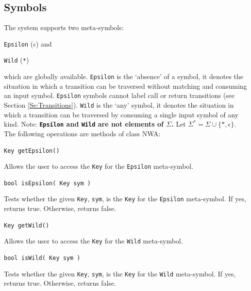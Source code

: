 \documentclass{llncs}
\begin{document}
\subsection{Symbols}
\label{Se:Symbols}

The system supports two meta-symbols: \begin{inparaenum} \item \texttt{Epsilon} (\texttt{$\epsilon$}) and \item \texttt{Wild} (\texttt{*}) \end{inparaenum} which are globally available.  \texttt{Epsilon} is the `absence' of a symbol, it denotes the situation in which a transition can be traversed without matching and consuming an input symbol.  \texttt{Epsilon} symbols cannot label call or return transitions (see Section \ref{Se:Transitions}).  \texttt{Wild} is the `any' symbol, it denotes the situation in which a transition can be traversed by consuming a single input symbol of any kind.  Note: \textbf{\texttt{Epsilon} and \texttt{Wild} are not elements of $\Sigma$.} Let $\Sigma^* = \Sigma \cup \{*, \epsilon\}$.\\  

\noindent The following operations are methods of class NWA:

\begin{description}

  \item\texttt{Key getEpsilon()}

    Allows the user to access the \texttt{Key} for the \texttt{Epsilon} meta-symbol.

  \item\texttt{bool isEpsilon( Key sym )}

    Tests whether the given \texttt{Key}, \texttt{sym}, is the \texttt{Key} for the \texttt{Epsilon} meta-symbol.  If yes, returns true.  Otherwise, returns false.

  \item\texttt{Key getWild()}

    Allows the user to access the \texttt{Key} for the \texttt{Wild} meta-symbol.

  \item\texttt{bool isWild( Key sym )}
 
    Tests whether the given \texttt{Key}, \texttt{sym}, is the \texttt{Key} for the \texttt{Wild} meta-symbol. If yes, returns true.  Otherwise, returns false. \\

\end{description}
\end{document}
